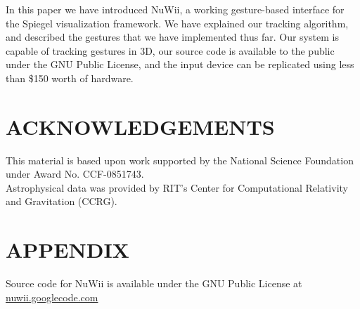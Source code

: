 \documentclass[a4paper,twoside]{article}
\begin{document}
In this paper we have introduced NuWii, a working gesture-based interface for
the Spiegel visualization framework. We have explained our tracking algorithm,
and described the gestures that we have implemented thus far. Our system is
capable of tracking gestures in 3D, our source code is available to the public
under the GNU Public License, and the input device can be replicated using less
than \$150 worth of hardware. 
    
\section*{\uppercase{Acknowledgements}}     This material is based upon work
supported by the National Science Foundation under Award No. CCF-0851743.\\ 
Astrophysical data was provided by RIT's Center for Computational Relativity
and Gravitation (CCRG).

\renewcommand{\baselinestretch}{0.98}  {\small
} \renewcommand{\baselinestretch}{1}

\section*{\uppercase{Appendix}} Source code for NuWii is available under the
GNU Public License at \url{nuwii.googlecode.com} 
\end{document}
